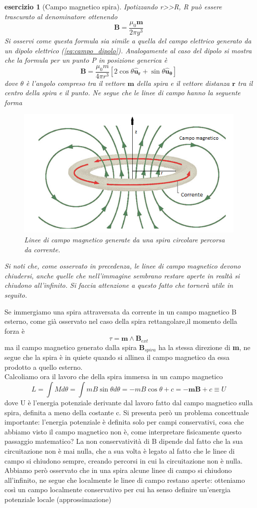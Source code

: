 \documentclass[10pt,a4paper]{article}
\newtheorem{esercizio}{esercizio}
\begin{document}
\begin{esercizio}[Campo magnetico spira]
Ipotizzando r>>R, R può essere trascurato al denominatore ottenendo 
\[\mathbf{B}=\frac{\mu_0 \mathbf{m}}{2\pi y^{3}}\]
Si osservi come questa formula sia simile a quella del campo elettrico generato da un dipolo elettrico (\ref{eq:campo_dipolo}). Analogamente al caso del dipolo si mostra che la formula per un punto P in posizione generica è  
\[\mathbf{B}=\frac{\mu_0 m }{4\pi r^3}[2\cos\theta\mathbf{\hat{u}_r}+\sin\theta\mathbf{\hat{u}_{\theta}}]\]
dove $\theta$ è l'angolo compreso tra il vettore \(\mathbf{m}\) della spira e il vettore distanza \(\mathbf{r}\) tra il centro della spira e il punto. Ne segue che le linee di campo hanno la seguente forma
\begin{figure}[h!]
	\centering
	\includegraphics[width=0.7\linewidth]{images/linee_campo_magnetico_spira}
	\caption{Linee di campo magnetico generate da una spira circolare percorsa da corrente.}
	\label{fig:lineecampomagneticospira}
\end{figure}
\FloatBarrier
Si noti che, come osservato in precedenza, le linee di campo magnetico devono chiudersi, anche quelle che nell'immagine sembrano restare aperte in realtà si chiudono all'infinito. Si faccia attenzione a questo fatto che tornerà utile in seguito.  
\end{esercizio}
Se immergiamo una spira attraversata da corrente in un campo magnetico B esterno, come già osservato nel caso della spira rettangolare,il momento della forza è 
\[\tau = \mathbf{m}\wedge\mathbf{B}_{ext}\]
ma il campo magnetico generato dalla spira \(\mathbf{B}_{spira}\) ha la stessa direzione di \textbf{m}, ne segue che la spira è in quiete quando si allinea il campo magnetico da essa prodotto a quello esterno.\\
Calcoliamo ora il lavoro che della spira immersa in un campo magnetico
\[L = \int M d\theta= \int m B \sin\theta d\theta= -mB\cos\theta + c= -\mathbf{m}\mathbf{B}+c \equiv U\]
dove U è l'energia potenziale derivante dal lavoro fatto dal campo magnetico sulla spira, definita a meno della costante c. Si presenta però un problema concettuale importante: l'energia potenziale è definita solo per campi conservativi, cosa che abbiamo visto il campo magnetico non è, come interpretare fisicamente questo passaggio matematico? La non conservatività di B dipende dal fatto che la sua circuitazione non è mai nulla, che a sua volta è legato al fatto che le linee di campo si chiudono sempre, creando percorsi in cui la circuitazione non è nulla. Abbiamo però osservato che in una spira alcune linee di campo si chiudono all'infinito, ne segue che localmente le linee di campo restano aperte: otteniamo così un campo localmente conservativo per cui ha senso definire un'energia potenziale locale (approssimazione)\\ 
\end{document}
